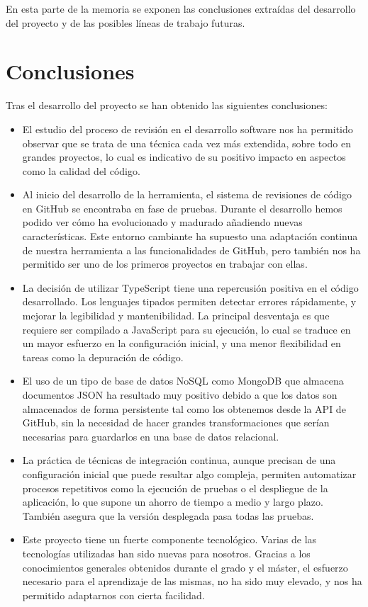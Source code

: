 
En esta parte de la memoria se exponen las conclusiones extraídas del desarrollo del proyecto y de las posibles líneas de trabajo futuras.

\section{Conclusiones}

Tras el desarrollo del proyecto se han obtenido las siguientes conclusiones:

\begin{itemize}
	\item El estudio del proceso de revisión en el desarrollo software nos ha permitido observar que se trata de una técnica cada vez más extendida, sobre todo en grandes proyectos, lo cual es indicativo de su positivo impacto en aspectos como la calidad del código.
	\item Al inicio del desarrollo de la herramienta, el sistema de revisiones de código en GitHub se encontraba en fase de pruebas. Durante el desarrollo hemos podido ver cómo ha evolucionado y madurado añadiendo nuevas características. Este entorno cambiante ha supuesto una adaptación continua de nuestra herramienta a las funcionalidades de GitHub, pero también nos ha permitido ser uno de los primeros proyectos en trabajar con ellas.
	\item La decisión de utilizar TypeScript tiene una repercusión positiva en el código desarrollado. Los lenguajes tipados permiten detectar errores rápidamente, y mejorar la legibilidad y mantenibilidad. La principal desventaja es que requiere ser compilado a JavaScript para su ejecución, lo cual se traduce en un mayor esfuerzo en la configuración inicial, y una menor flexibilidad en tareas como la depuración de código.
	\item El uso de un tipo de base de datos NoSQL como MongoDB que almacena documentos JSON ha resultado muy positivo debido a que los datos son almacenados de forma persistente tal como los obtenemos desde la API de GitHub, sin la necesidad de hacer grandes transformaciones que serían necesarias para guardarlos en una base de datos relacional.
	\item La práctica de técnicas de integración continua, aunque precisan de una configuración inicial que puede resultar algo compleja, permiten automatizar procesos repetitivos como la ejecución de pruebas o el despliegue de la aplicación, lo que supone un ahorro de tiempo a medio y largo plazo. También asegura que la versión desplegada pasa todas las pruebas.
	\item Este proyecto tiene un fuerte componente tecnológico. Varias de las tecnologías utilizadas han sido nuevas para nosotros. Gracias a los conocimientos generales obtenidos durante el grado y el máster, el esfuerzo necesario para el aprendizaje de las mismas, no ha sido muy elevado, y nos ha permitido adaptarnos con cierta facilidad.
\end{itemize}

